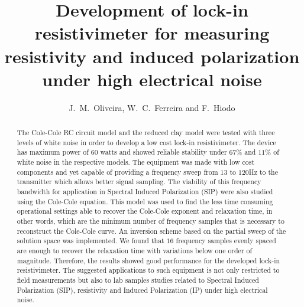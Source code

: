 \documentclass{vie16}
\begin{document}
\title{Development of lock-in resistivimeter for measuring
resistivity and induced polarization under high electrical noise}
\author{J.~M.~Oliveira, W.~C.~Ferreira and F.~Hiodo}
\maketitle


\begin{abstract}

	The Cole-Cole RC circuit model and the reduced clay model were
	tested with three levels of white noise in order to develop a low
	cost lock-in resistivimeter. The device has maximum power of 60
	watts and showed reliable stability under $67 \%$ and $11 \%$ of
	white noise in the respective models. The equipment was made with
	low cost components and yet capable of providing a frequency sweep
	from $13$ to $120$Hz to the transmitter which allows better signal
	sampling. The viability of this frequency bandwidth for application in
	Spectral Induced Polarization (SIP) were also studied using the
	Cole-Cole equation. This model was used to find the less time
	consuming operational settings able to recover the Cole-Cole
	exponent and relaxation time, in other words, which are the minimum
	number of frequency samples that is necessary to reconstruct the
	Cole-Cole curve. An inversion scheme based on the partial sweep of
	the solution space was implemented. We found that $16$ frequency
	samples evenly spaced are enough to recover the relaxation time with
	variations below one order of magnitude. Therefore, the results
	showed good performance for the developed lock-in resistivimeter.
	The suggested applications to such equipment is not only restricted
	to field measurements but also to lab samples studies related to
	Spectral Induced Polarization (SIP), resistivity and Induced
	Polarization (IP) under high electrical noise.  
\end{abstract}	
		

\newpage
\end{document}
